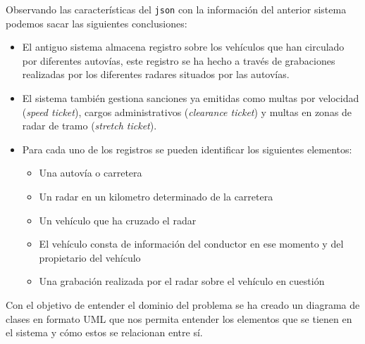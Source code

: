 \documentclass[]{article}
\begin{document}
Observando las características del \texttt{json} con la información del anterior sistema podemos sacar las siguientes conclusiones:
\begin{itemize}
    \item El antiguo sistema almacena registro sobre los vehículos que han circulado por diferentes autovías, este registro se ha hecho a través de grabaciones realizadas por los diferentes radares situados por las autovías.
    \item El sistema también gestiona sanciones ya emitidas como multas por velocidad (\textit{speed ticket}), cargos administrativos (\textit{clearance ticket}) y multas en zonas de radar de tramo (\textit{stretch ticket}).
    \item Para cada uno de los registros se pueden identificar los siguientes elementos:
    \begin{itemize}
        \item Una autovía o carretera
        \item Un radar en un kilometro determinado de la carretera
        \item Un vehículo que ha cruzado el radar
        \item El vehículo consta de información del conductor en ese momento y del propietario del vehículo
        \item Una grabación realizada por el radar sobre el vehículo en cuestión
    \end{itemize} 
\end{itemize}

Con el objetivo de entender el dominio del problema se ha creado un diagrama de clases en formato UML que nos permita entender los elementos que se tienen en el sistema y cómo estos se relacionan entre sí.
\end{document}
